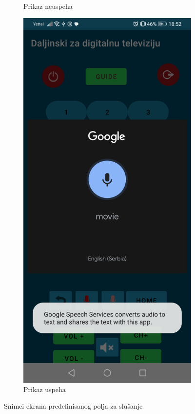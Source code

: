 \documentclass[implementacija.tex]{subfiles}
\begin{document}
\begin{figure}
\begin{subfigure}[b]{0.3\textwidth}
  \caption{Prikaz neuspeha}
  \label{fig:google_neuspesno}
    \end{subfigure}
    \hfill
    \begin{subfigure}[b]{0.3\textwidth}
        \centering
        \includegraphics[width=\textwidth,keepaspectratio]{Implementacija/snimci_ekrana/11_obican_google_uspesno.jpg}
  \caption{Prikaz uspeha}
   \label{fig:google_uspesno}
    \end{subfigure}
    \caption{Snimci ekrana predefinisanog polja za slušanje}
    \label{fig:obavestenja}
\end{figure}
\end{document}
